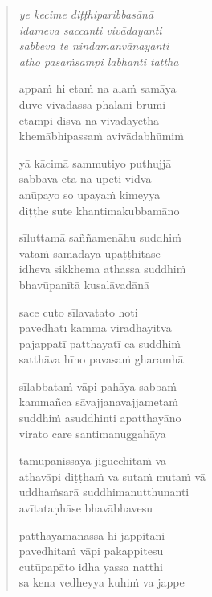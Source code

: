 

\cleartoverso

\vspace*{30mm}

\begin{verse}

\emph{ye kecime diṭṭhiparibbasānā\\
idameva saccanti vivādayanti}\\
\emph{sabbeva te nindamanvānayanti\\
atho pasaṁsampi labhanti tattha}

appaṁ hi etaṁ na alaṁ samāya\\
duve vivādassa phalāni brūmi\\
etampi disvā na vivādayetha\\
khemābhipassaṁ avivādabhūmiṁ

yā kācimā sammutiyo puthujjā\\
sabbāva etā na upeti vidvā\\
anūpayo so upayaṁ kimeyya\\
diṭṭhe sute khantimakubbamāno

sīluttamā saññamenāhu suddhiṁ\\
vataṁ samādāya upaṭṭhitāse\\
idheva sikkhema athassa suddhiṁ\\
bhavūpanītā kusalāvadānā

sace cuto sīlavatato hoti\\
pavedhatī kamma virādhayitvā\\
pajappatī patthayatī ca suddhiṁ\\
satthāva hīno pavasaṁ gharamhā

sīlabbataṁ vāpi pahāya sabbaṁ\\
kammañca sāvajjanavajjametaṁ\\
suddhiṁ asuddhinti apatthayāno\\
virato care santimanuggahāya

tamūpanissāya jigucchitaṁ vā\\
athavāpi diṭṭhaṁ va sutaṁ mutaṁ vā\\
uddhaṁsarā suddhimanutthunanti\\
avītataṇhāse bhavābhavesu

patthayamānassa hi jappitāni\\
pavedhitaṁ vāpi pakappitesu\\
cutūpapāto idha yassa natthi\\
sa kena vedheyya kuhiṁ va jappe


\end{verse}
